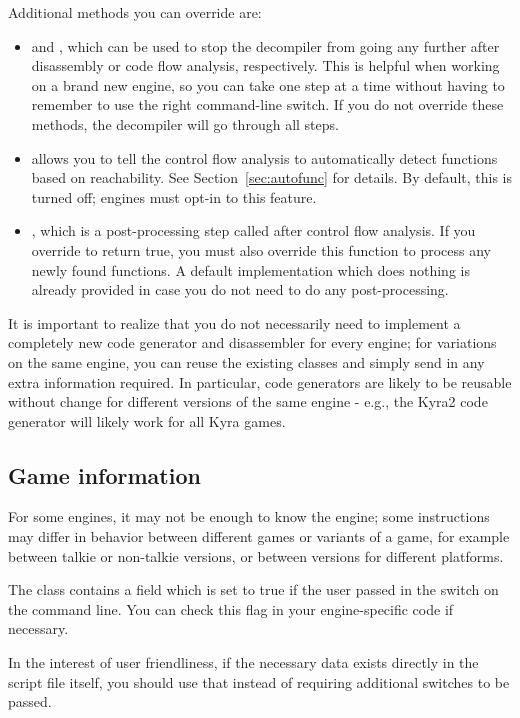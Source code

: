 Additional methods you can override are:
\begin{itemize}
\item {} and , which can be used to stop the decompiler from going any further after disassembly or code flow analysis, respectively. This is helpful when working on a brand new engine, so you can take one step at a time without having to remember to use the right command-line switch. If you do not override these methods, the decompiler will go through all steps.
\item {} allows you to tell the control flow analysis to automatically detect functions based on reachability. See Section~\vref{sec:autofunc} for details. By default, this is turned off; engines must opt-in to this feature.
\item {}, which is a post-processing step called after control flow analysis. If you override  to return true, you must also override this function to process any newly found functions. A default implementation which does nothing is already provided in case you do not need to do any post-processing.
\end{itemize}

It is important to realize that you do not necessarily need to implement a completely new code generator and disassembler for every engine; for variations on the same engine, you can reuse the existing classes and simply send in any extra information required. In particular, code generators are likely to be reusable without change for different versions of the same engine - e.g., the Kyra2 code generator will likely work for all Kyra games.

\subsection{Game information}
For some engines, it may not be enough to know the engine; some instructions may differ in behavior between different games or variants of a game, for example between talkie or non-talkie versions, or between versions for different platforms.

The  class contains a field  which is set to true if the user passed in the  switch on the command line. You can check this flag in your engine-specific code if necessary.

In the interest of user friendliness, if the necessary data exists directly in the script file itself, you should use that instead of requiring additional switches to be passed.

